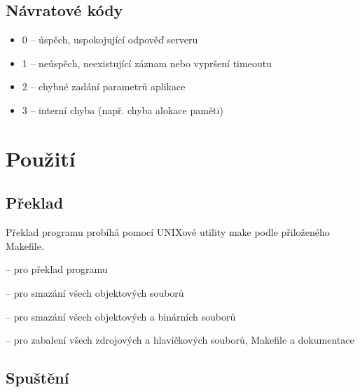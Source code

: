 \documentclass[11pt, a4paper, titlepage]{article}
\begin{document}
	\subsection{Návratové kódy}
	\begin{itemize}
		\item 0 -- úspěch, uspokojující odpověď serveru
		\item 1 -- neúspěch, neexistující záznam nebo vypršení timeoutu
		\item 2 -- chybné zadání parametrů aplikace
		\item 3 -- interní chyba (např. chyba alokace paměti)
	\end{itemize}


\section{Použití}

	\subsection{Překlad}

		Překlad programu probíhá pomocí UNIXové utility make podle přiloženého Makefile.

		\begin{description}
			\item {} -- pro překlad programu
			\item {} -- pro smazání všech objektových souborů
			\item {} -- pro smazání všech objektových a binárních souborů
			\item {} -- pro zabalení všech zdrojových a hlavičkových souborů, Makefile a dokumentace
		\end{description}



	\subsection{Spuštění}

		\smallskip

		\smallskip
\end{document}
